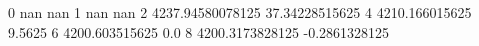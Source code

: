 0 nan nan
1 nan nan
2 4237.94580078125 37.34228515625
4 4210.166015625 9.5625
6 4200.603515625 0.0
8 4200.3173828125 -0.2861328125
